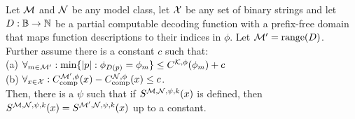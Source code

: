 \begin{lemma}
\label{lemma:thecoolone}
Let ${\cal M}$ and ${\cal N}$ be any model class, let ${\cal X}$ be any set of binary strings and let $D:{\mathbb B}\to{\mathbb N}$ be a partial computable decoding function with a prefix-free domain that maps function descriptions to their indices in $\phi$. Let ${\cal M}'= \textnormal{range}(D)$. Further assume there is a constant $c$ such that:\\
\-\hspace{1cm}(a) $\forall_{m\in{\cal M}'}:\min\{|p|:\phi_{D(p)}=\phi_m\}\le C^{{\cal K},\phi}(\phi_m)+c$\\
\-\hspace{1cm}(b) $\forall_{x\in{\cal X}}: C_{\textnormal{comp}}^{{\cal M}', \phi}(x) - C_{\textnormal{comp}}^{{\cal N}, \phi}(x) \le c$.\\
Then, there is a $\psi$ such that if $S^{{\cal M},{\cal N},\psi,k}(x)$ is defined, then $S^{{\cal M},{\cal N},\psi,k}(x) = S^{{\cal M}',{\cal N},\psi,k}(x)$ up to a constant. 
\end{lemma}
